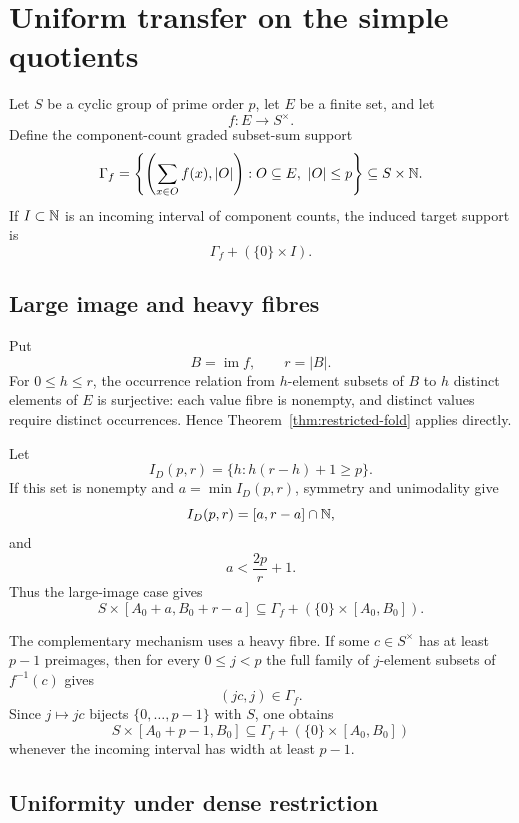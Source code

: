 \section{Uniform transfer on the simple quotients}
\label{sec:local-profile}

Let $S$ be a cyclic group of prime order $p$, let $E$ be a finite set, and let
\[
f:E\longrightarrow S^\times.
\]
Define the component-count graded subset-sum support
\begin{equation}\label{eq:gamma-f}
\Gamma_f=
\left\{
\left(\sum_{x\in O}f(x),|O|\right):
O\subseteq E,\ |O|\le p
\right\}
\subseteq S\times\mathbb N.
\end{equation}
If $I\subset\mathbb N$ is an incoming interval of component counts, the induced target support is
\[
\Gamma_f+(\{0\}\times I).
\]

\subsection{Large image and heavy fibres}

Put
\[
B=\operatorname{im}f,
\qquad r=|B|.
\]
For $0\le h\le r$, the occurrence relation from $h$-element subsets of $B$ to $h$ distinct elements of $E$ is surjective: each value fibre is nonempty, and distinct values require distinct occurrences.  Hence Theorem~\ref{thm:restricted-fold} applies directly.

Let
\[
I_D(p,r)=\{h:h(r-h)+1\ge p\}.
\]
If this set is nonempty and $a=\min I_D(p,r)$, symmetry and unimodality give
\[
I_D(p,r)=[a,r-a]\cap\mathbb N,
\]
and
\begin{equation}\label{eq:rich-demand}
a<\frac{2p}{r}+1.
\end{equation}
Thus the large-image case gives
\begin{equation}\label{eq:rich-rectangle}
S\times[A_0+a,B_0+r-a]
\subseteq
\Gamma_f+(\{0\}\times[A_0,B_0]).
\end{equation}

The complementary mechanism uses a heavy fibre.  If some $c\in S^\times$ has at least $p-1$ preimages, then for every $0\le j<p$ the full family of $j$-element subsets of $f^{-1}(c)$ gives
\[
(jc,j)\in\Gamma_f.
\]
Since $j\mapsto jc$ bijects $\{0,\ldots,p-1\}$ with $S$, one obtains
\begin{equation}\label{eq:poor-rectangle}
S\times[A_0+p-1,B_0]
\subseteq
\Gamma_f+(\{0\}\times[A_0,B_0])
\end{equation}
whenever the incoming interval has width at least $p-1$.

\subsection{Uniformity under dense restriction}

